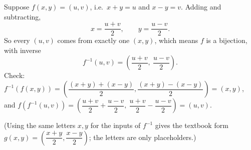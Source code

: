 Suppose $f(x,y)=(u,v)$, i.e.\ $x+y=u$ and $x-y=v$. Adding and subtracting,
\[
x=\dfrac{u+v}{2},\qquad y=\dfrac{u-v}{2}.
\]
So every $(u,v)$ comes from exactly one $(x,y)$, which means $f$ is a bijection, with inverse
\[
\boxed{f^{-1}(u,v)=\left(\dfrac{u+v}{2},\ \dfrac{u-v}{2}\right)}.
\]
Check: $f^{-1}(f(x,y))=\left(\dfrac{(x+y)+(x-y)}{2},\dfrac{(x+y)-(x-y)}{2}\right)=(x,y)$, and $f(f^{-1}(u,v))=\left(\dfrac{u+v}{2}+\dfrac{u-v}{2},\ \dfrac{u+v}{2}-\dfrac{u-v}{2}\right)=(u,v)$.

(Using the same letters $x,y$ for the inputs of $f^{-1}$ gives the textbook form $g(x,y)=\left(\dfrac{x+y}{2},\dfrac{x-y}{2}\right)$; the letters are only placeholders.)
